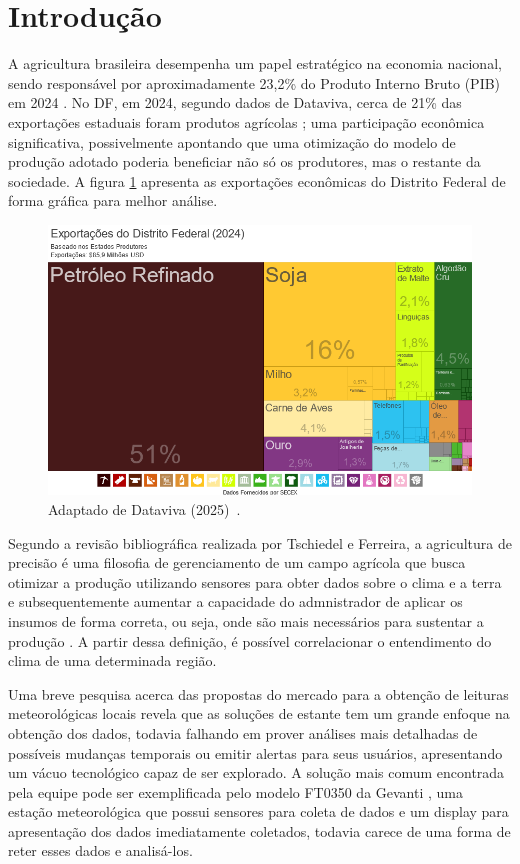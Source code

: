 \section{Introdução}\label{sec:intro}

\indent A agricultura brasileira desempenha um papel estratégico na economia nacional, sendo responsável por aproximadamente 23,2\% do Produto Interno Bruto (PIB) em 2024 \cite{cna2025}. No DF, em 2024, segundo dados de Dataviva, cerca de 21\% das exportações estaduais foram produtos agrícolas \cite{dataviva-graph-2025}; uma participação econômica significativa, possivelmente apontando que uma otimização do modelo de produção adotado poderia beneficiar não só os produtores, mas o restante da sociedade. A figura \ref{fig:dfexp} apresenta as exportações econômicas do Distrito Federal de forma gráfica para melhor análise.

\begin{figure}[!htpb]
    \centering
    \includegraphics[width=.9\columnwidth]{figuras/expdf_area.png}
    \caption{Adaptado de Dataviva (2025)~\cite{dataviva-graph-2025}.}
    \label{fig:dfexp}
\end{figure}

Segundo a revisão bibliográfica realizada por Tschiedel e Ferreira, a agricultura de precisão é uma filosofia de gerenciamento de um campo agrícola que busca otimizar a produção utilizando sensores para obter dados sobre o clima e a terra e subsequentemente aumentar a capacidade do admnistrador de aplicar os insumos de forma correta, ou seja, onde são mais necessários para sustentar a produção \cite{tschiedel_ferreira_2002}. A partir dessa definição, é possível correlacionar o entendimento do clima de uma determinada região.

Uma breve pesquisa acerca das propostas do mercado para a obtenção de leituras meteorológicas locais revela que as soluções de estante tem um grande enfoque na obtenção dos dados, todavia falhando em prover análises mais detalhadas de possíveis mudanças temporais ou emitir alertas para seus usuários, apresentando um vácuo tecnológico capaz de ser explorado. A solução mais comum encontrada pela equipe pode ser exemplificada pelo modelo FT0350 da Gevanti \cite{FT0350}, uma estação meteorológica que possui sensores para coleta de dados e um display para apresentação dos dados imediatamente coletados, todavia carece de uma forma de reter esses dados e analisá-los.

